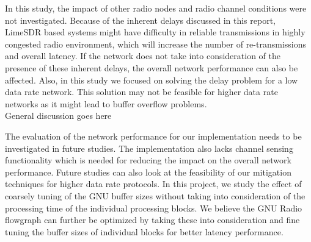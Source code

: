 In this study, the impact of other radio nodes and radio channel conditions were not investigated. Because of the inherent delays discussed in this report, LimeSDR based systems might have difficulty in reliable transmissions in highly congested radio environment, which will increase the number of re-transmissions and overall latency. If the network does not take into consideration of the presence of these inherent delays, the overall network performance can also be affected. Also, in this study we focused on solving the delay problem for a low data rate network. This solution may not be feasible for higher data rate networks as it might lead to buffer overflow problems.\\

General discussion goes here

The evaluation of the network performance for our implementation needs to be investigated in future studies.
The implementation also lacks channel sensing functionality which is needed for reducing the impact on the overall network performance.
Future studies can also look at the feasibility of our mitigation techniques for higher data rate protocols.
In this project, we study the effect of coarsely tuning of the GNU buffer sizes without taking into consideration of the processing time of the individual processing blocks.
We believe the GNU Radio flowgraph can further be optimized by taking these into consideration and fine tuning the buffer sizes of individual blocks for better latency performance.

